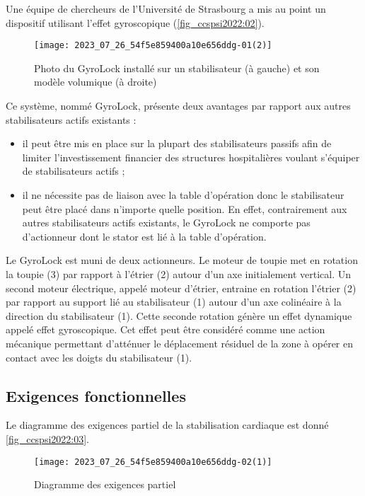 Une équipe de chercheurs de l'Université de Strasbourg a mis au point un dispositif utilisant l'effet gyroscopique (\autoref{fig_ccspsi2022:02}).

\begin{figure}[!h]
\centering
\texttt{[image: 2023\_07\_26\_54f5e859400a10e656ddg-01(2)]}
\caption{\label{fig_ccspsi2022:02}Photo du GyroLock installé sur un stabilisateur (à gauche) et son modèle volumique (à droite)}
\end{figure}


Ce système, nommé GyroLock, présente deux avantages par rapport aux autres stabilisateurs actifs existants :

\begin{itemize}
  \item il peut être mis en place sur la plupart des stabilisateurs passifs afin de limiter l'investissement financier des structures hospitalières voulant s'équiper de stabilisateurs actifs ;

  \item il ne nécessite pas de liaison avec la table d'opération donc le stabilisateur peut être placé dans n'importe quelle position. En effet, contrairement aux autres stabilisateurs actifs existants, le GyroLock ne comporte pas d'actionneur dont le stator est lié à la table d'opération.

\end{itemize}

Le GyroLock est muni de deux actionneurs. Le moteur de toupie met en rotation la toupie (3) par rapport à l'étrier (2) autour d'un axe initialement vertical. Un second moteur électrique, appelé moteur d'étrier, entraine en rotation l'étrier (2) par rapport au support lié au stabilisateur (1) autour d'un axe colinéaire à la direction du stabilisateur (1). Cette seconde rotation génère un effet dynamique appelé effet gyroscopique. Cet effet peut être considéré comme une action mécanique permettant d'atténuer le déplacement résiduel de la zone à opérer en contact avec les doigts du stabilisateur (1).

\subsection*{Exigences fonctionnelles}
Le diagramme des exigences partiel de la stabilisation cardiaque est donné \autoref{fig_ccspsi2022:03}.


\begin{figure}[!h]
\centering
\texttt{[image: 2023\_07\_26\_54f5e859400a10e656ddg-02(1)]}
\caption{Diagramme des exigences partiel\label{fig_ccspsi2022:03}}
\end{figure}

